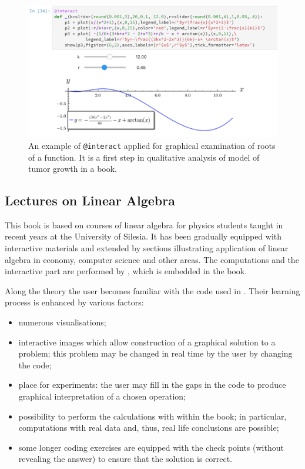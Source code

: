 \documentclass{deliverablereport}
\begin{document}
\begin{figure}
\centerline{\includegraphics[width=.7\textwidth]{interact_npb.png}}
\caption{\label{fig:interact2} An example of \texttt{@interact}
  applied for graphical examination of roots of a function. It is a
  first step in qualitative analysis of model of tumor growth in a
  book.  }
\end{figure}







\subsection{Lectures on Linear Algebra}

This book is based on courses of linear algebra for physics students
taught in recent years at the University of Silesia. It has been
gradually equipped with interactive materials and extended by sections
illustrating application of linear algebra in economy, computer
science and other areas. The computations and the interactive part are
performed by \Sage, which is embedded in the book.

Along the theory the user becomes familiar with the code used in
\Sage. Their learning process is enhanced by various factors:
\begin{itemize}
\item numerous visualisations;
\item interactive images which allow construction of a graphical
  solution to a problem; this problem may be changed in real time by
  the user by changing the code;
\item place for experiments: the user may fill in the gaps in the code
  to produce graphical interpretation of a chosen operation;
\item possibility to perform the calculations with \Sage within the
  book; in particular, computations with real data and, thus, real
  life conclusions are possible;
\item some longer coding exercises are equipped with the check points
  (without revealing the answer) to ensure that the solution is
  correct.
\end{itemize}
\end{document}
